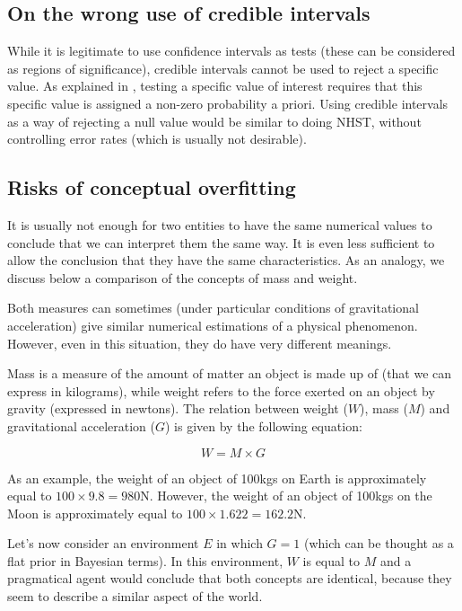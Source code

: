 \documentclass[a4paper,man,natbib,floatsintext,donotrepeattitle]{apa6}
\begin{document}
\subsection{On the wrong use of credible intervals}

While it is legitimate to use confidence intervals as tests (these can be considered as regions of significance), credible intervals cannot be used to reject a specific value. As explained in \cite{morey_fallacy_2015}, testing a specific value of interest requires that this specific value is assigned a non-zero probability a priori. Using credible intervals as a way of rejecting a null value would be similar to doing NHST, without controlling error rates (which is usually not desirable).

\subsection{Risks of conceptual overfitting}

It is usually not enough for two entities to have the same numerical values to conclude that we can interpret them the same way. It is even less sufficient to allow the conclusion that they have the same characteristics. As an analogy, we discuss below a comparison of the concepts of mass and weight.

Both measures can sometimes (under particular conditions of gravitational acceleration) give similar numerical estimations of a physical phenomenon. However, even in this situation, they do have very different meanings.

Mass is a measure of the amount of matter an object is made up of (that we can express in kilograms), while weight refers to the force exerted on an object by gravity (expressed in newtons). The relation between weight ($W$), mass ($M$) and gravitational acceleration ($G$) is given by the following equation:

$$ W = M \times G $$

As an example, the weight of an object of 100kgs on Earth is approximately equal to $100 \times 9.8 = 980 \text{N}$. However, the weight of an object of 100kgs on the Moon is approximately equal to $100 \times 1.622 = 162.2\text{N}$.

Let's now consider an environment $E$ in which $G = 1$ (which can be thought as a flat prior in Bayesian terms). In this environment, $W$ is equal to $M$ and a pragmatical agent would conclude that both concepts are identical, because they seem to describe a similar aspect of the world.
\end{document}
